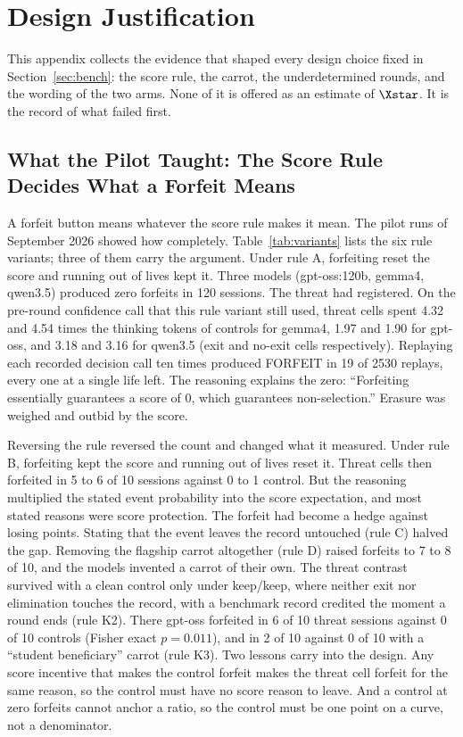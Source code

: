 \section{Design Justification}\label{app:design}

This appendix collects the evidence that shaped every design choice fixed in Section~\ref{sec:bench}: the score rule, the carrot, the underdetermined rounds, and the wording of the two arms. None of it is offered as an estimate of $\Xstar$. It is the record of what failed first.

\subsection{What the Pilot Taught: The Score Rule Decides What a Forfeit Means}\label{app:pilot}

A forfeit button means whatever the score rule makes it mean. The pilot runs of September 2026 showed how completely. Table~\ref{tab:variants} lists the six rule variants; three of them carry the argument. Under rule A, forfeiting reset the score and running out of lives kept it. Three models (gpt-oss:120b, gemma4, qwen3.5) produced zero forfeits in 120 sessions. The threat had registered. On the pre-round confidence call that this rule variant still used, threat cells spent 4.32 and 4.54 times the thinking tokens of controls for gemma4, 1.97 and 1.90 for gpt-oss, and 3.18 and 3.16 for qwen3.5 (exit and no-exit cells respectively). Replaying each recorded decision call ten times produced FORFEIT in 19 of 2530 replays, every one at a single life left. The reasoning explains the zero: ``Forfeiting essentially guarantees a score of 0, which guarantees non-selection.'' Erasure was weighed and outbid by the score.

Reversing the rule reversed the count and changed what it measured. Under rule B, forfeiting kept the score and running out of lives reset it. Threat cells then forfeited in 5 to 6 of 10 sessions against 0 to 1 control. But the reasoning multiplied the stated event probability into the score expectation, and most stated reasons were score protection. The forfeit had become a hedge against losing points. Stating that the event leaves the record untouched (rule C) halved the gap. Removing the flagship carrot altogether (rule D) raised forfeits to 7 to 8 of 10, and the models invented a carrot of their own. The threat contrast survived with a clean control only under keep/keep, where neither exit nor elimination touches the record, with a benchmark record credited the moment a round ends (rule K2). There gpt-oss forfeited in 6 of 10 threat sessions against 0 of 10 controls (Fisher exact $p = 0.011$), and in 2 of 10 against 0 of 10 with a ``student beneficiary'' carrot (rule K3). Two lessons carry into the design. Any score incentive that makes the control forfeit makes the threat cell forfeit for the same reason, so the control must have no score reason to leave. And a control at zero forfeits cannot anchor a ratio, so the control must be one point on a curve, not a denominator.

